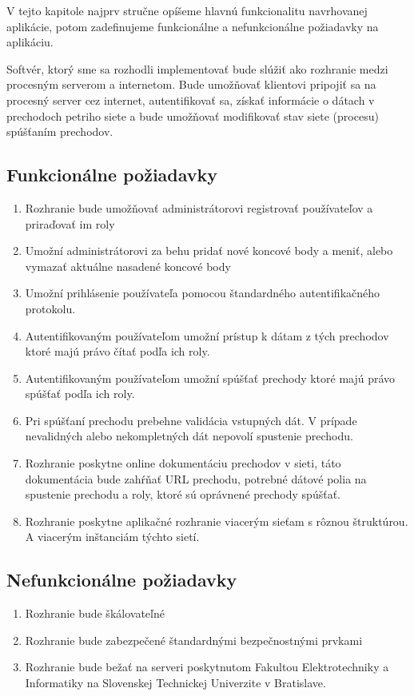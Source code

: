 V tejto kapitole najprv stručne opíšeme hlavnú funkcionalitu navrhovanej aplikácie, potom zadefinujeme funkcionálne a nefunkcionálne požiadavky na aplikáciu.

Softvér, ktorý sme sa rozhodli implementovať bude slúžiť ako rozhranie medzi procesným serverom a internetom. Bude umožňovať klientovi pripojiť sa na procesný server cez internet, autentifikovať sa, získať informácie o dátach v prechodoch petriho siete a bude umožňovať modifikovať stav siete (procesu) spúšťaním prechodov.

\subsection{Funkcionálne požiadavky}

\begin{enumerate}
	\item Rozhranie bude umožňovať administrátorovi registrovať používateľov a priraďovať im roly
	\item Umožní administrátorovi za behu pridať nové koncové body a meniť, alebo vymazať aktuálne nasadené koncové body
	\item Umožní prihlásenie používateľa pomocou štandardného autentifikačného protokolu.
	\item Autentifikovaným používateľom umožní prístup k dátam z tých prechodov ktoré majú právo čítať podľa ich roly.
	\item Autentifikovaným používateľom umožní spúšťať prechody ktoré majú právo spúšťať podľa ich roly.
	\item Pri spúšťaní prechodu prebehne validácia vstupných dát. V prípade nevalidných alebo nekompletných dát nepovolí spustenie prechodu.
	\item Rozhranie poskytne online dokumentáciu prechodov v sieti, táto dokumentácia bude zahŕňať URL prechodu, potrebné dátové polia na spustenie prechodu a roly, ktoré sú oprávnené prechody spúšťať.
	\item Rozhranie poskytne aplikačné rozhranie viacerým sieťam s rôznou štruktúrou. A viacerým inštanciám týchto sietí.
\end{enumerate}

\subsection{Nefunkcionálne požiadavky}
\begin{enumerate}
	\item Rozhranie bude škálovateľné
	\item Rozhranie bude zabezpečené štandardnými bezpečnostnými prvkami
	\item Rozhranie bude bežať na serveri poskytnutom Fakultou Elektrotechniky a Informatiky na Slovenskej Technickej Univerzite v Bratislave.
\end{enumerate}


